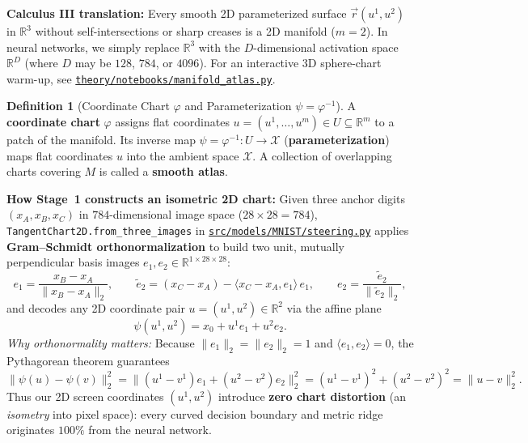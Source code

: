 \documentclass[11pt,a4paper]{article}
\newcommand{\R}{\mathbb{R}}
\theoremstyle{definition}
\newtheorem{definition}{Definition}[section]
\begin{document}
\noindent
\textbf{Calculus III translation:} Every smooth 2D parameterized surface $\vec{r}(u^1, u^2)$ in $\R^3$ without self-intersections or sharp creases is a 2D manifold ($m = 2$). In neural networks, we simply replace $\R^3$ with the $D$-dimensional activation space $\R^D$ (where $D$ may be $128$, $784$, or $4096$). For an interactive 3D sphere-chart warm-up, see \href{run:notebooks/manifold_atlas.py}{\texttt{theory/notebooks/manifold\_atlas.py}}.

\begin{definition}[Coordinate Chart $\varphi$ and Parameterization $\psi = \varphi^{-1}$]
A \textbf{coordinate chart} $\varphi$ assigns flat coordinates $u = (u^1, \dots, u^m) \in U \subseteq \R^m$ to a patch of the manifold. Its inverse map $\psi = \varphi^{-1} : U \to \mathcal{X}$ (\textbf{parameterization}) maps flat coordinates $u$ into the ambient space $\mathcal{X}$. A collection of overlapping charts covering $M$ is called a \textbf{smooth atlas}.
\end{definition}

\noindent
\textbf{How Stage~1 constructs an isometric 2D chart:} Given three anchor digits $(x_A, x_B, x_C)$ in $784$-dimensional image space ($28 \times 28 = 784$), \texttt{TangentChart2D.from\_three\_images} in \href{run:../src/models/MNIST/steering.py}{\texttt{src/models/MNIST/steering.py}} applies \textbf{Gram--Schmidt orthonormalization} to build two unit, mutually perpendicular basis images $e_1, e_2 \in \R^{1 \times 28 \times 28}$:
\begin{equation}
    e_1 = \frac{x_B - x_A}{\|x_B - x_A\|_2}, \qquad
    \tilde{e}_2 = (x_C - x_A) - \langle x_C - x_A, e_1 \rangle\, e_1, \qquad
    e_2 = \frac{\tilde{e}_2}{\|\tilde{e}_2\|_2},
    \label{eq:gram-schmidt}
\end{equation}
and decodes any 2D coordinate pair $u = (u^1, u^2) \in \R^2$ via the affine plane
\begin{equation}
    \psi(u^1, u^2) = x_0 + u^1 e_1 + u^2 e_2.
    \label{eq:chart-decode}
\end{equation}
\emph{Why orthonormality matters:} Because $\|e_1\|_2 = \|e_2\|_2 = 1$ and $\langle e_1, e_2 \rangle = 0$, the Pythagorean theorem guarantees
\[
    \|\psi(u) - \psi(v)\|_2^2 = \|(u^1 - v^1)e_1 + (u^2 - v^2)e_2\|_2^2 = (u^1 - v^1)^2 + (u^2 - v^2)^2 = \|u - v\|_2^2.
\]
Thus our 2D screen coordinates $(u^1, u^2)$ introduce \textbf{zero chart distortion} (an \emph{isometry} into pixel space): every curved decision boundary and metric ridge originates $100\%$ from the neural network.
\end{document}
